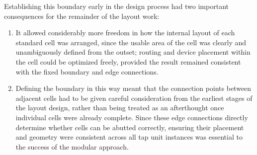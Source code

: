 Establishing this boundary early in the design process had two important consequences for the remainder of the layout work:

\begin{enumerate}
	\item It allowed considerably more freedom in how the internal layout of each standard cell was arranged, since the usable area of the cell was clearly and unambiguously defined from the outset; routing and device placement within the cell could be optimized freely, provided the result remained consistent with the fixed boundary and edge connections.
	\item Defining the boundary in this way meant that the connection points between adjacent cells had to be given careful consideration from the earliest stages of the layout design, rather than being treated as an afterthought once individual cells were already complete. Since these edge connections directly determine whether cells can be abutted correctly, ensuring their placement and geometry were consistent across all tap unit instances was essential to the success of the modular approach.
\end{enumerate}

